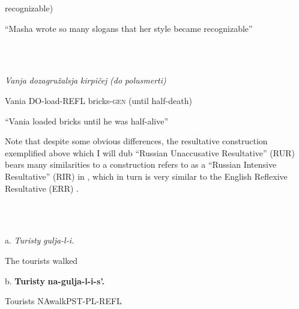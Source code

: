 \documentclass[output=paper,modfonts, nonflat]{langsci/langscibook}
\begin{document}
\begin{styleinnerExample}
  recognizable)
\end{styleinnerExample}

\begin{styleinnerExample}
  “Masha wrote so many slogans that her style became recognizable”
\end{styleinnerExample}

\begin{styleinnerExample}
\ea%
    \label{ex:key:34}
    \gll\\
        \\
    \glt
    \z

          \textit{Vanja} \textit{dozagružalsja}    \textit{kirpičej}      \textit{(do}    \textit{polusmerti)}
\end{styleinnerExample}

\begin{styleinnerExample}
  Vania DO-load-REFL bricks-\textsc{gen} (until half-death)
\end{styleinnerExample}

\begin{styleinnerExample}
  “Vania loaded bricks until he was half-alive”
\end{styleinnerExample}

Note that despite some obvious differences, the resultative construction exemplified above which I will dub “Russian Unaccusative Resultative” (RUR) bears many similarities to a construction \citet{Tatevosov2010} refers to as a “Russian Intensive Resultative” (RIR) in , which in turn is very similar to the English Reflexive Resultative (ERR) .

\begin{styleinnerExample}
\ea%
    \label{ex:key:35}
    \gll\\
        \\
    \glt
    \z

           a.  \textit{Turisty} \textit{gulja-l-i.}
\end{styleinnerExample}

\begin{styleinnerExample}
    The tourists walked
\end{styleinnerExample}

\begin{styleinnerExample}
  b.  \textbf{Turisty} \textbf{na-gulja-l-i-s’.} 
\end{styleinnerExample}

\begin{styleinnerExample}
    Tourists NAwalkPST-PL-REFL
\end{styleinnerExample}
\end{document}
